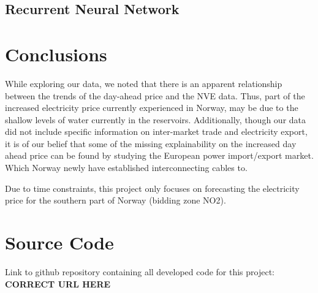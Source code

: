 \documentclass
[twocolumn,
secnumarabic,
nobibnotes,
aps,
prl,
reprint,
groupedaddress,
amsmath,
amssymb,
]{revtex4-2}
\begin{document}
\subsection{Recurrent Neural Network}

\section{Conclusions}

While exploring our data, we noted that there is an apparent relationship between the trends of the day-ahead price and the NVE data. Thus, part of the increased electricity price currently experienced in Norway, may be due to the shallow levels of water currently in the reservoirs. Additionally, though our data did not include specific information on inter-market trade and electricity export, it is of our belief that some of the missing explainability on the increased day ahead price can be found by studying the European power import/export market. Which Norway newly have established interconnecting cables to.

Due to time constraints, this project only focuses on forecasting the electricity price for the southern part of Norway (bidding zone NO2). 

\appendix

\section{Source Code}
\label{sec:sc}
Link to github repository containing all developed code for this project: \textbf{CORRECT URL HERE}%





\end{document}
